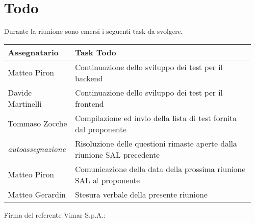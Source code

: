 \section{Todo}
Durante la riunione sono emersi i seguenti task da svolgere.

\begin{center}
    \begin{tabular}{|L{5cm}|L{8cm}|}
        \hline
        \textbf{Assegnatario} & \textbf{Task Todo} \\ \hline
        Matteo Piron &  Continuazione dello sviluppo dei test per il backend \\ \hline
        Davide Martinelli & Continuazione dello sviluppo dei test per il frontend \\ \hline
        Tommaso Zocche & Compilazione ed invio  della lista di test fornita dal proponente \\ \hline
        \textit{autoassegnazione} & Risoluzione delle questioni rimaste aperte dalla riunione SAL precedente \\ \hline
        Matteo Piron & Comunicazione della data della prossima riunione SAL al proponente \\ \hline
        Matteo Gerardin &  Stesura verbale della presente riunione \\ \hline
    \end{tabular}
\end{center}

\vspace{4cm}
\noindent Firma del referente Vimar S.p.A.: \underline{\hspace{5cm}}